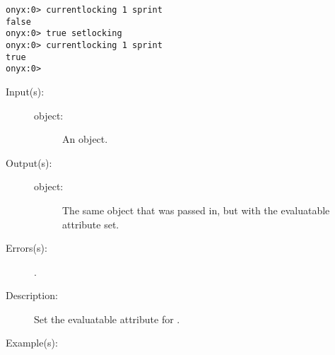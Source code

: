 \begin{description}
\begin{description}
\begin{verbatim}
onyx:0> currentlocking 1 sprint
false
onyx:0> true setlocking
onyx:0> currentlocking 1 sprint
true
onyx:0>
		\end{verbatim}
	\end{description}
\label{systemdict:cve}
\item[{\onyxop{object}{cve}{object}}: ]
	\begin{description}\item[]
	\item[Input(s): ]
		\begin{description}\item[]
		\item[object: ]
			An object.
		\end{description}
	\item[Output(s): ]
		\begin{description}\item[]
		\item[object: ]
			The same object that was passed in, but with the
			evaluatable attribute set.
		\end{description}
	\item[Errors(s): ]
		\begin{description}\item[]
		\item[.]
		\end{description}
	\item[Description: ]
		Set the evaluatable attribute for .
	\item[Example(s): ]\begin{verbatim}


\end{verbatim}
\end{description}
\end{description}
